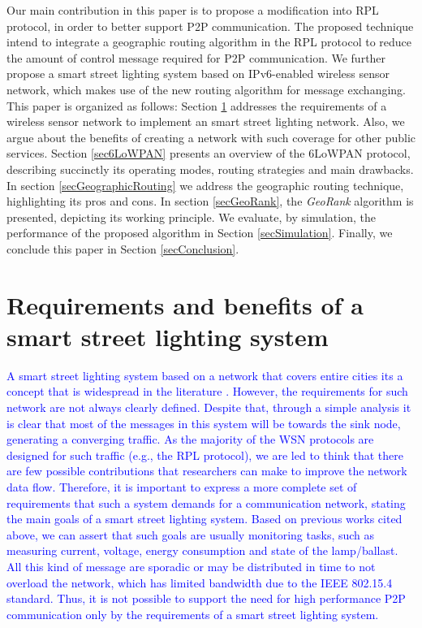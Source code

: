 \documentclass[authoryear,preprint,review,12pt]{elsarticle}
\newcommand{\rev}{\textcolor{blue}}
\begin{document}
Our main contribution in this paper is to propose a modification into RPL protocol, in order to better support P2P communication. The proposed technique intend to integrate a geographic routing algorithm in the RPL protocol to reduce the amount of control message required for P2P communication. We further propose a smart street lighting system based on IPv6-enabled wireless sensor network, which makes use of the new routing algorithm for message exchanging. This paper is organized as follows: Section \ref{secRequirements} addresses the requirements of a wireless sensor network to implement an smart street lighting network. Also, we argue about the benefits of creating a network with such coverage for other public services. Section \ref{sec6LoWPAN} presents an overview of the 6LoWPAN protocol, describing succinctly its operating modes, routing strategies and main drawbacks. In section \ref{secGeographicRouting} we address the geographic routing technique, highlighting its pros and cons. In section \ref{secGeoRank}, the \textit{GeoRank} algorithm is presented, depicting its working principle. We evaluate, by simulation, the performance of the proposed algorithm in Section \ref{secSimulation}. Finally, we conclude this paper in Section \ref{secConclusion}.


\section{Requirements and benefits of a smart street lighting system}
\label{secRequirements}
\rev{A smart street lighting system based on a network that covers entire cities its a concept that is widespread in the literature \citep{Our_IAS_2009, WSN_Street_Lighting_2010_1, Cellular_Street_Lighting_2010_1, WSN_Street_Lighting_2010_2,Pantoni_2011, Pantoni_2013, daFonseca_2015}. However, the requirements for such network are not always clearly defined. Despite that, through a simple analysis it is clear that most of the messages in this system will be towards the sink node, generating a converging traffic. As the majority of the WSN protocols are designed for such traffic (e.g., the RPL protocol), we are led to think that there are few possible contributions that researchers can make to improve the network data flow. Therefore, it is important to express a more complete set of requirements that such a system demands for a communication network, stating the main goals of a smart street lighting system. Based on previous works cited above, we can assert that such goals are usually monitoring tasks, such as measuring current, voltage, energy consumption and state of the lamp/ballast. All this kind of message are sporadic or may be distributed in time to not overload the network, which has limited bandwidth due to the IEEE 802.15.4 standard. Thus, it is not possible to support the need for high performance P2P communication only by the requirements of a smart street lighting system.}
\end{document}
